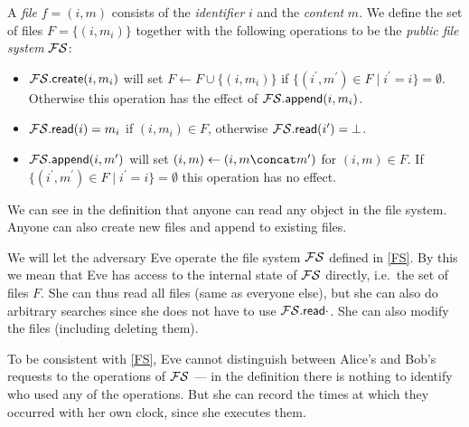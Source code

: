 \begin{definition}\label{FS}
  A \emph{file} \(f = (i, m)\) consists of the \emph{identifier} \(i\) and the 
  \emph{content} \(m\).
  We define the set of files \(F = \{(i, m_i)\}\) together with the following 
  operations to be the \emph{public file system} \(\FS\):
  \begin{itemize}
    \item \(\fscreate[i][m_i]\) will set \(F\gets F\cup \{(i, m_i)\}\) if 
      \(\{(i^\prime, m^\prime)\in F \mid i^\prime = i\} = \emptyset\).
      Otherwise this operation has the effect of \(\fsappend[i][m_i]\).

    \item \(\fsread[i] = m_i\) if \((i, m_i)\in F\), otherwise 
      \(\fsread[i^\prime] = \bot\).

    \item \(\fsappend[i][m^\prime]\) will set \((i, m)\gets (i, m\concat 
        m^\prime)\) for \((i, m)\in F\).
      If \(\{(i^\prime, m^\prime)\in F\mid i^\prime = i\} = \emptyset\) this 
      operation has no effect.
  \end{itemize}
\end{definition}

We can see in the definition that anyone can read any object in the file 
system.
Anyone can also create new files and append to existing files.

%

We will let the adversary Eve operate the file system \(\FS\) defined in 
\cref{FS}.
By this we mean that Eve has access to the internal state of \(\FS\) directly, 
i.e.\ the set of files \(F\).
She can thus read all files (same as everyone else), but she can also do 
arbitrary searches since she does not have to use \(\fsread{\cdot}\).
She can also modify the files (including deleting them).

To be consistent with \cref{FS}, Eve cannot distinguish between Alice's and 
Bob's requests to the operations of \(\FS\) --- in the definition there is 
nothing to identify who used any of the operations.
But she can record the times at which they occurred with her own clock, since 
she executes them.


